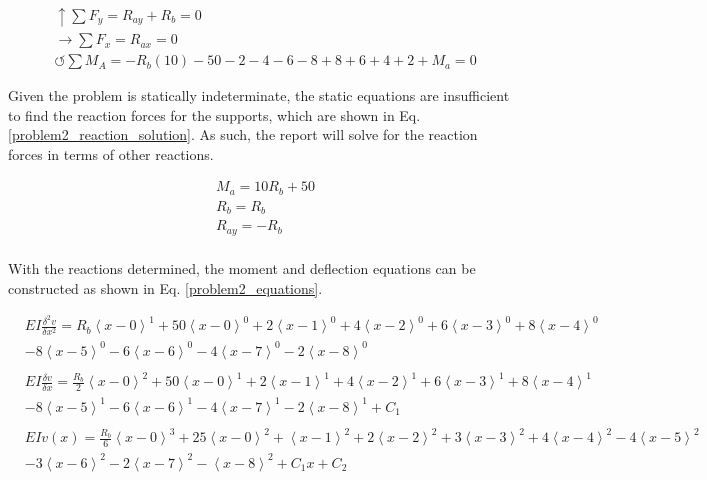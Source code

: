 \documentclass[a4paper]{article}
\begin{document}
\begin{equation}
\begin{split}
	&\uparrow \sum F_y = R_{ay} + R_b = 0 \\
 	&\rightarrow \sum F_x = R_{ax} = 0 \\
 	&\circlearrowleft \sum M_A = -R_b(10) -50 - 2 - 4 - 6 - 8 + 8 + 6 + 4 + 2 + M_a = 0
\end{split}
\label{problem2_reaction_equation}
\end{equation}

Given the problem is statically indeterminate, the static equations are insufficient to find the reaction forces for the supports, which are shown in Eq. \ref{problem2_reaction_solution}. As such, the report will solve for the reaction forces in terms of other reactions.

\begin{equation}
\begin{split}
	& M_a = 10R_b + 50 \\
	& R_{b} = R_b \\
	& R_{ay} = - R_b \\
\end{split}
\label{problem2_reaction_solution}
\end{equation}

With the reactions determined, the moment and deflection equations can be constructed as shown in Eq. \ref{problem2_equations}.

\begin{equation}
    \begin{split}
& EI \frac{\delta^2 v}{\delta x^2} = R_b\left<x-0\right>^1 + 50\left<x-0\right>^0 + 2\left<x-1\right>^0 + 4\left<x-2\right>^0 + 6\left<x-3\right>^0 + 8\left<x-4\right>^0    \\
& -  8\left<x-5\right>^0 - 6\left<x-6\right>^0 -  4\left<x-7\right>^0 - 2\left<x-8\right>^0 \\
& \\
& EI \frac{\delta v}{\delta x} = \frac{R_b}{2}\left<x-0\right>^2 + 50\left<x-0\right>^1 + 2\left<x-1\right>^1 + 4\left<x-2\right>^1 +  6\left<x-3\right>^1 + 8\left<x-4\right>^1  \\
& -  8\left<x-5\right>^1 - 6\left<x-6\right>^1 -  4\left<x-7\right>^1 - 2\left<x-8\right>^1 + C_1 \\
& \\
& EI v(x) = \frac{R_b}{6}\left<x-0\right>^3 + 25\left<x-0\right>^2 + \left<x-1\right>^2 + 2\left<x-2\right>^2 +  3\left<x-3\right>^2 + 4\left<x-4\right>^2   -  4\left<x-5\right>^2 \\
& - 3\left<x-6\right>^2  -  2\left<x-7\right>^2 - \left<x-8\right>^2 + C_1 x + C_2 \\
    \end{split}
\label{problem2_equations}
\end{equation}
\end{document}
